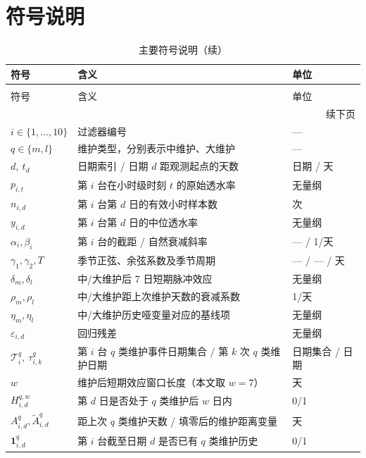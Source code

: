 \documentclass[12pt, a4paper, fontset=fandol]{ctexart}
\theoremstyle{definition}
\begin{document}
\section{符号说明}

\begingroup
\small
\renewcommand{\arraystretch}{1.08}
\begin{longtable}{p{}p{}p{}}
\caption{主要符号说明}\\
\toprule
符号 & 含义 & 单位 \\
\midrule
\endfirsthead
\caption[]{主要符号说明（续）}\\
\toprule
符号 & 含义 & 单位 \\
\midrule
\endhead
\midrule
\multicolumn{3}{r}{续下页} \\
\endfoot
\bottomrule
\endlastfoot
$i \in \{1,\ldots,10\}$ & 过滤器编号 & --- \\
$q \in \{m,l\}$ & 维护类型，分别表示中维护、大维护 & --- \\
$d,\ t_d$ & 日期索引 / 日期 $d$ 距观测起点的天数 & 日期 / 天 \\
$p_{i,t}$ & 第 $i$ 台在小时级时刻 $t$ 的原始透水率 & 无量纲 \\
$n_{i,d}$ & 第 $i$ 台第 $d$ 日的有效小时样本数 & 次 \\
$y_{i,d}$ & 第 $i$ 台第 $d$ 日的中位透水率 & 无量纲 \\
$\alpha_i, \beta_i$ & 第 $i$ 台的截距 / 自然衰减斜率 & --- / 1/天 \\
$\gamma_1,\gamma_2,T$ & 季节正弦、余弦系数及季节周期 & --- / --- / 天 \\
$\delta_m,\delta_l$ & 中/大维护后 7 日短期脉冲效应 & 无量纲 \\
$\rho_m,\rho_l$ & 中/大维护距上次维护天数的衰减系数 & 1/天 \\
$\eta_m,\eta_l$ & 中/大维护历史哑变量对应的基线项 & 无量纲 \\
$\varepsilon_{i,d}$ & 回归残差 & 无量纲 \\
$\mathcal{T}_i^q,\ \tau_{i,k}^q$ & 第 $i$ 台 $q$ 类维护事件日期集合 / 第 $k$ 次 $q$ 类维护日期 & 日期集合 / 日期 \\
$w$ & 维护后短期效应窗口长度（本文取 $w=7$） & 天 \\
$H_{i,d}^{q,w}$ & 第 $d$ 日是否处于 $q$ 类维护后 $w$ 日内 & 0/1 \\
$A_{i,d}^q,\tilde{A}_{i,d}^q$ & 距上次 $q$ 类维护天数 / 填零后的维护距离变量 & 天 \\
$\mathbf{1}_{i,d}^q$ & 第 $i$ 台截至日期 $d$ 是否已有 $q$ 类维护历史 & 0/1 \\

\end{longtable}
\end{document}

